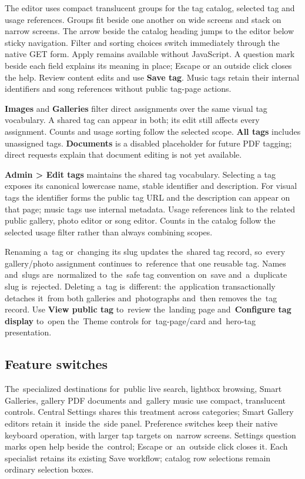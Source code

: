 \documentclass[11pt,a4paper]{article}
\newcommand{\ui}[1]{\textbf{#1}}
\begin{document}
The editor uses compact translucent groups for the tag catalog, selected tag
and usage references. Groups fit beside one another on wide screens and stack
on narrow screens. The arrow beside the catalog heading jumps to the editor
below sticky navigation. Filter and sorting choices switch immediately through
the native GET form. Apply remains available without JavaScript. A question mark
beside each field explains its meaning in place;
Escape or an outside click closes the help. Review content edits and use
\ui{Save tag}. Music tags retain their internal identifiers and song references
without public tag-page actions.

\ui{Images} and \ui{Galleries} filter direct assignments over the same visual
tag vocabulary. A shared tag can appear in both; its edit still affects every
assignment. Counts and usage sorting follow the selected scope. \ui{All tags}
includes unassigned tags. \ui{Documents} is a disabled placeholder for future
PDF tagging; direct requests explain that document editing is not yet available.

\ui{Admin > Edit tags} maintains the shared tag vocabulary. Selecting a tag
exposes its canonical lowercase name, stable identifier and description. For
visual tags the identifier forms the public tag URL and the description can
appear on that page; music tags use internal metadata. Usage references link
to the related public gallery, photo editor or song editor. Counts in the
catalog follow the selected usage filter rather than always combining scopes.

Renaming a~tag or~changing its slug updates the~shared tag record, so~every
gallery/photo assignment continues to~reference that one reusable tag. Names
and~slugs are~normalized to~the~safe tag convention on~save and~a~duplicate slug
is~rejected. Deleting a~tag is~different: the~application transactionally
detaches it~from both galleries and~photographs and~then removes the~tag record.
Use \ui{View public tag} to~review the~landing page and~\ui{Configure tag
display} to~open the~Theme controls for~tag-page/card and~hero-tag presentation.

\subsection{Feature switches}

The~specialized destinations for~public live search, lightbox browsing,
Smart Galleries, gallery PDF documents and~gallery music use compact,
translucent controls. Central Settings shares this treatment across categories;
Smart Gallery editors retain it~inside the~side panel. Preference switches keep
their native keyboard operation, with larger tap targets on~narrow screens.
Settings question marks open help beside the~control; Escape or~an~outside
click closes it. Each specialist retains its existing Save workflow; catalog
row selections remain ordinary selection boxes.
\end{document}

